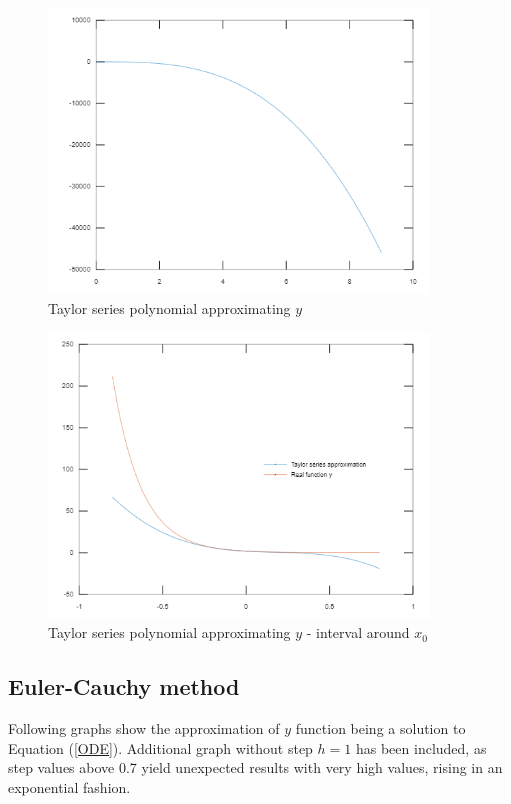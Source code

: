 \documentclass[a4paper,12pt]{article}
\begin{document}
\begin{figure}[H]
    \centering
    \includegraphics[width=0.9\textwidth]{taylor_big.png}
    \caption{Taylor series polynomial approximating $y$}
    \label{fig:taylor_big}
\end{figure}
\begin{figure}[H]
    \centering
    \includegraphics[width=0.9\textwidth]{taylor_small.png}
    \caption{Taylor series polynomial approximating $y$ - interval around $x_0$}
    \label{fig:taylor_small}
\end{figure}

\subsection{Euler-Cauchy method}
Following graphs show the approximation of $y$ function being a solution to Equation (\ref{ODE}). Additional graph without step $h = 1$ has been included, as step values above 0.7 yield unexpected results with very high values, rising in an exponential fashion.
\end{document}
